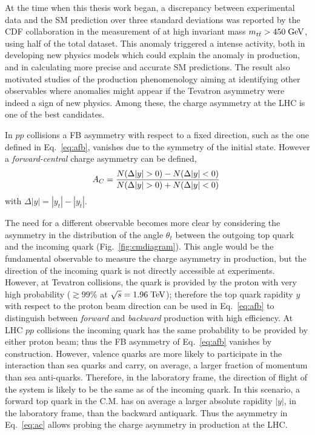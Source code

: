 At the time when this thesis work began, a discrepancy between
experimental data and the SM prediction over three standard deviations
was reported by the CDF collaboration in the measurement of \afb{} at
high \ttbar{} invariant mass $m_{t\bar{t}}{}>450\; \mathrm{GeV}{}$, using half of the
total dataset. This anomaly triggered a intense activity, both in
developing new physics models which could explain the anomaly in
\ttbar{} production, and in calculating more precise and accurate SM
predictions. The result also motivated studies of the \ttbar{}
production phenomenology aiming at identifying other observables where
anomalies might appear if the Tevatron asymmetry were indeed a
sign of new physics. Among these, the charge asymmetry at the LHC is
one of the best candidates. 

In $pp$ collisions a FB asymmetry with respect to a fixed direction,
such as the one defined in Eq.~\ref{eq:afb}, vanishes due to the
symmetry of the initial state. However a {\it forward-central} charge
asymmetry \ac{} can be defined, 
\begin{equation}
\label{eq:ac}
\ac{}=\frac{N(\Delta{}|y|>0)-N(\Delta{}|y|<0)}{N(\Delta{}|y|>0)+N(\Delta{}|y|<0)}
\phantom{,}
\end{equation}
with $\Delta{}|y|=|y_t| - |y_{\bar{t}}|$.

The need for a different observable becomes more clear by considering
the asymmetry in the distribution of the angle $\theta_t$ between the outgoing
top quark and the incoming quark (Fig.~\ref{fig:cmdiagram}). This angle
would be the fundamental observable to measure the charge asymmetry in
\ttbar{} production, but the direction of the incoming quark is
not directly accessible at experiments. However, at Tevatron \ppbar{}
collisions, the quark is provided by the proton with very high
probability ($\gtrsim{}99\%$ at $\sqrt{s}=1.96\; \mathrm{TeV}{}$); therefore the
top quark rapidity $y$ with respect to the proton beam direction can
be used in Eq.~\ref{eq:afb} to distinguish between {\it forward} and
{\it backward} production with high efficiency. At LHC $pp$ collisions
the incoming quark has the same probability to be provided by
either proton beam; thus the FB asymmetry of Eq.~\ref{eq:afb} vanishes by
construction. However, valence quarks are more likely to participate
in the interaction than sea quarks and carry, on average, a larger fraction of
momentum than sea anti-quarks. Therefore, in the laboratory frame, the
direction of flight of the \ttbar{} system is likely to be the same as of
the incoming quark. In this scenario, a forward top quark in
the \ttbar{} C.M. has on average a larger absolute rapidity $|y|$, in
the laboratory frame, than the backward antiquark. Thus the asymmetry
in Eq.~\ref{eq:ac} allows probing the charge asymmetry in \ttbar{}
production at the LHC.


